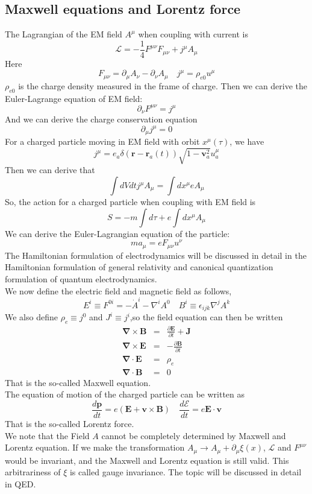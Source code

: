 \documentclass[cyan]{elegantnote}
\begin{document}
\subsection{Maxwell equations and Lorentz force}
\noindent
The Lagrangian of the EM field $A^{\mu}$ when coupling with current is
\[\mathcal{L} = -\frac{1}{4}F^{\mu\nu}F_{\mu\nu} + j^{\mu} A_{\mu}\]
Here
\[F_{\mu\nu} = \partial_{\mu}A_{\nu} - \partial_{\nu}A_{\mu} \quad j^{\mu} = \rho_{e0} u^{\mu}\]
$\rho_{e0}$ is the charge density measured in the frame of charge.
Then we can derive the Euler-Lagrange equation of EM field:
\[\partial_{\nu} F^{\mu\nu} = j^{\mu}\]
And we can derive the charge conservation equation
\[\partial_{\mu} j^{\mu} = 0\]
For a charged particle moving in EM field with orbit $x^{\mu}(\tau)$, we have
\[j^{\mu} =  e_a \delta(\bm{r}-\bm{r}_a(t)) \sqrt{1-\bm{v}_a^2} u_a^\mu \]
Then we can derive that
\[\int dV dt j^{\mu} A_{\mu} = \int dx^{\mu} e A_{\mu}\]
So, the action for a charged particle when coupling with EM field is
\[S = - m \int d\tau + e\int dx^{\mu} A_{\mu}\]
We can derive the Euler-Lagrangian equation of the particle:
\[ma_{\mu} = eF_{\mu \nu}u^{\nu}\]
The Hamiltonian formulation of electrodynamics will be discussed in detail in the Hamiltonian formulation of general relativity and canonical quantization formulation of quantum electrodynamics.\\
We now define the electric field and magnetic field as follows,
\[E^i \equiv F^{0i} = -\dot{A}^i - \nabla^i A^0 \quad B^i \equiv \epsilon_{ijk} \nabla^j A^k\]
We also define $\rho_e \equiv j^0$ and $J^i \equiv j^i$,so
the field equation can then be written
\begin{eqnarray}
\bm{\nabla} \times  \bm{B} &=& \frac{\partial \bm{E}}{\partial t} +  \bm{J} \nonumber \\
\bm{\nabla} \times \bm{E} &=& -\frac{\partial \bm{B}}{\partial t} \nonumber \\
\bm{\nabla} \cdot \bm{E} &=& \rho_e \nonumber \\
\bm{\nabla} \cdot \bm{B} &=& 0 \nonumber
\end{eqnarray}
That is the so-called Maxwell equation.\\
The equation of motion of the charged particle can be written as
\[\frac{d\bm{p}}{dt} = e(\bm{E} + \bm{v} \times \bm{B}) \quad \frac{d \mathcal{E}}{dt} = e \bm{E} \cdot \bm{v}\]
That is the so-called Lorentz force.\\
We note that the Field $A$ cannot be completely determined by Maxwell and Lorentz equation. If we make the transformation $A_{\mu} \to A_{\mu} + \partial_{\mu} \xi(x)$, $\mathcal{L}$ and $F^{\mu\nu}$ would be invariant, and the Maxwell and Lorentz equation is still valid. This arbitrariness of $\xi$ is called gauge invariance. The topic will be discussed in detail in QED.
\end{document}
